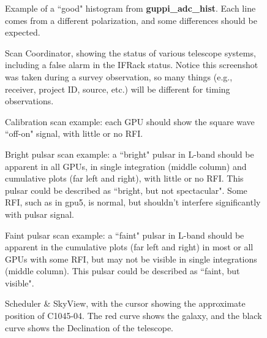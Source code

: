 \documentclass[11pt, reqno, tbtags]{article}
\begin{document}
\begin{figure}[h]
 \centering
  \caption{Example of a ``good" histogram from \textbf{guppi\_adc\_hist}.  Each line comes from a different polarization, and some differences should be expected.}  
  \label{fig:gah}
\end{figure}


\begin{figure}[h]
 \centering
  \caption{Scan Coordinator, showing the status of various telescope systems, including a false alarm in the IFRack status. Notice this screenshot was taken during a survey observation, so many things (e.g., receiver, project ID, source, etc.) will be different for timing observations.  }
  \label{fig:sc}
\end{figure}


\begin{figure}[h]
 \centering
  \caption{Calibration scan example: each GPU should show the square wave ``off-on" signal, with little or no RFI.}
  \label{fig:cal}
\end{figure}


\begin{figure}[h]
 \centering
  \caption{Bright pulsar scan example: a ``bright" pulsar in L-band should be apparent in all GPUs, in single integration (middle column) and cumulative plots (far left and right), with little or no RFI.  This pulsar could be described as ``bright, but not spectacular".  Some RFI, such as in gpu5, is normal, but shouldn't interfere significantly with pulsar signal.}
  \label{fig:bright}
\end{figure}


\begin{figure}[h]
 \centering
  \caption{Faint pulsar scan example: a ``faint" pulsar in L-band should be apparent in the cumulative plots (far left and right) in most or all GPUs with some RFI, but may not be visible in single integrations (middle column).  This pulsar could be described as ``faint, but visible".}
  \label{fig:faint}
\end{figure}


\begin{figure}[h]
 \centering
  \caption{Scheduler \& SkyView, with the cursor showing the approximate position of C1045-04.  The red curve shows the galaxy, and the black curve shows the Declination of the telescope.}
  \label{fig:ssv}
\end{figure}
\end{document}
